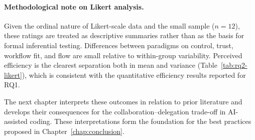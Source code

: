 \paragraph{Methodological note on Likert analysis.}

Given the ordinal nature of Likert-scale data and the small sample ($n=12$), these ratings are treated as descriptive summaries rather than as the basis for formal inferential testing. Differences between paradigms on control, trust, workflow fit, and flow are small relative to within-group variability. Perceived efficiency is the clearest separation both in mean and variance (Table~\ref{tab:rq2-likert}), which is consistent with the quantitative efficiency results reported for RQ1.

The next chapter interprets these outcomes in relation to prior literature and develops their consequences for the collaboration--delegation trade-off in AI-assisted coding. These interpretations form the foundation for the best practices proposed in Chapter~\ref{chap:conclusion}.
